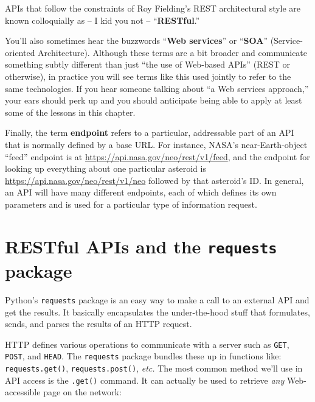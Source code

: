
APIs that follow the constraints of Roy Fielding's REST architectural style
are known colloquially as -- I kid you not -- ``\textbf{RESTful}.''


You'll also sometimes hear the buzzwords ``\textbf{Web services}'' or
``\textbf{SOA}'' (Service-oriented Architecture). Although these terms are a
bit broader and communicate something subtly different than just ``the use of
Web-based APIs'' (REST or otherwise), in practice you will see terms like this
used jointly to refer to the same technologies. If you hear someone talking
about ``a Web services approach,'' your ears should perk up and you should
anticipate being able to apply at least some of the lessons in this chapter.


Finally, the term \textbf{endpoint} refers to a particular, addressable part
of an API that is normally defined by a base URL. For instance, NASA's
near-Earth-object ``feed'' endpoint is at
\url{https://api.nasa.gov/neo/rest/v1/feed}, and the endpoint for looking up
everything about one particular asteroid is
\url{https://api.nasa.gov/neo/rest/v1/neo} followed by that asteroid's ID. In
general, an API will have many different endpoints, each of which defines its
own parameters and is used for a particular type of information request.

\section{RESTful APIs and the \texttt{requests} package}


Python's \texttt{requests} package is an easy way to make a call to an
external API and get the results. It basically encapsulates the under-the-hood
stuff that formulates, sends, and parses the results of an HTTP request.


HTTP defines various operations to communicate with a server such as
\texttt{GET}, \texttt{POST}, and \texttt{HEAD}. The \texttt{requests} package
bundles these up in functions like: \texttt{requests.get()},
\texttt{requests.post()}, \textit{etc.} The most common method we'll use in API
access is the \texttt{.get()} command. It can actually be used to retrieve
\textit{any} Web-accessible page on the network:

